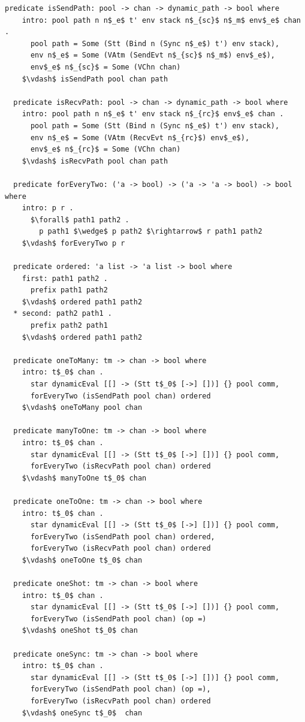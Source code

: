 \documentclass[letterpaper, 11pt]{extarticle}
\begin{document}
\begin{lstlisting}[language=logic, mathescape]
  predicate isSendPath: pool -> chan -> dynamic_path -> bool where
    intro: pool path n n$_e$ t' env stack n$_{sc}$ n$_m$ env$_e$ chan .
      pool path = Some (Stt (Bind n (Sync n$_e$) t') env stack),
      env n$_e$ = Some (VAtm (SendEvt n$_{sc}$ n$_m$) env$_e$), 
      env$_e$ n$_{sc}$ = Some (VChn chan)
    $\vdash$ isSendPath pool chan path

  predicate isRecvPath: pool -> chan -> dynamic_path -> bool where
    intro: pool path n n$_e$ t' env stack n$_{rc}$ env$_e$ chan .
      pool path = Some (Stt (Bind n (Sync n$_e$) t') env stack),
      env n$_e$ = Some (VAtm (RecvEvt n$_{rc}$) env$_e$),
      env$_e$ n$_{rc}$ = Some (VChn chan)
    $\vdash$ isRecvPath pool chan path

  predicate forEveryTwo: ('a -> bool) -> ('a -> 'a -> bool) -> bool where
    intro: p r .
      $\forall$ path1 path2 .
        p path1 $\wedge$ p path2 $\rightarrow$ r path1 path2
    $\vdash$ forEveryTwo p r

  predicate ordered: 'a list -> 'a list -> bool where
    first: path1 path2 .
      prefix path1 path2
    $\vdash$ ordered path1 path2
  * second: path2 path1 .
      prefix path2 path1
    $\vdash$ ordered path1 path2

  predicate oneToMany: tm -> chan -> bool where
    intro: t$_0$ chan .
      star dynamicEval [[] -> (Stt t$_0$ [->] [])] {} pool comm,
      forEveryTwo (isSendPath pool chan) ordered
    $\vdash$ oneToMany pool chan

  predicate manyToOne: tm -> chan -> bool where
    intro: t$_0$ chan .
      star dynamicEval [[] -> (Stt t$_0$ [->] [])] {} pool comm,
      forEveryTwo (isRecvPath pool chan) ordered
    $\vdash$ manyToOne t$_0$ chan

  predicate oneToOne: tm -> chan -> bool where
    intro: t$_0$ chan .
      star dynamicEval [[] -> (Stt t$_0$ [->] [])] {} pool comm,
      forEveryTwo (isSendPath pool chan) ordered,
      forEveryTwo (isRecvPath pool chan) ordered
    $\vdash$ oneToOne t$_0$ chan

  predicate oneShot: tm -> chan -> bool where
    intro: t$_0$ chan .
      star dynamicEval [[] -> (Stt t$_0$ [->] [])] {} pool comm,
      forEveryTwo (isSendPath pool chan) (op =)
    $\vdash$ oneShot t$_0$ chan

  predicate oneSync: tm -> chan -> bool where
    intro: t$_0$ chan .
      star dynamicEval [[] -> (Stt t$_0$ [->] [])] {} pool comm,
      forEveryTwo (isSendPath pool chan) (op =),
      forEveryTwo (isRecvPath pool chan) ordered 
    $\vdash$ oneSync t$_0$  chan

\end{lstlisting}
\end{document}
